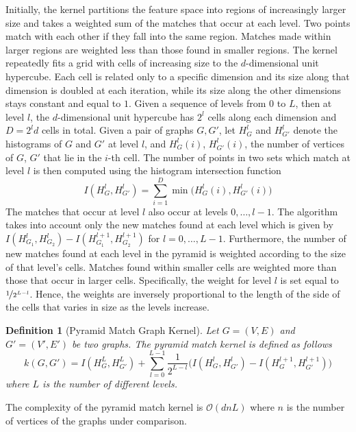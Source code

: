 \documentclass[twoside,11pt]{article}
\newtheorem{definition}{Definition}
\begin{document}
Initially, the kernel partitions the feature space into regions of increasingly larger size and takes a weighted sum of the matches that occur at each level.
Two points match with each other if they fall into the same region.
Matches made within larger regions are weighted less than those found in smaller regions.
The kernel repeatedly fits a grid with cells of increasing size to the $d$-dimensional unit hypercube.
Each cell is related only to a specific dimension and its size along that dimension is doubled at each iteration, while its size along the other dimensions stays constant and equal to $1$.
Given a sequence of levels from $0$ to $L$, then at level $l$, the $d$-dimensional unit hypercube has $2^l$ cells along each dimension and $D = 2^{l}d$ cells in total.
Given a pair of graphs $G,G'$, let $H_G^l$ and $H_{G'}^l$ denote the histograms of $G$ and $G'$ at level $l$, and $H_G^l(i)$, $H_{G'}^l(i)$, the number of vertices of $G$, $G'$ that lie in the $i$-th cell.
The number of points in two sets which match at level $l$ is then computed using the histogram intersection function
\begin{equation}
  I(H_G^l,H_{G'}^l) = \sum_{i=1}^D \min\big(H_G^l(i),H_{G'}^l(i)\big)
\end{equation}
The matches that occur at level $l$ also occur at levels $0, \ldots, l-1$.
The algorithm takes into account only the new matches found at each level which is given by $I(H_{G_1}^l,H_{G_2}^l) - I(H_{G_1}^{l+1},H_{G_2}^{l+1})$ for $l=0,\ldots,L-1$.
Furthermore, the number of new matches found at each level in the pyramid is weighted according to the size of that level's cells.
Matches found within smaller cells are weighted more than those that occur in larger cells.
Specifically, the weight for level $l$ is set equal to $\nicefrac{1}{2^{L-l}}$.
Hence, the weights are inversely proportional to the length of the side of the cells that varies in size as the levels increase.

\begin{definition}[Pyramid Match Graph Kernel]
  Let $G=(V,E)$ and $G'=(V',E')$ be two graphs.
	The pyramid match kernel is defined as follows
	\begin{equation}
	  k(G,G') = I(H_G^L,H_{G'}^L) + \sum_{l=0}^{L-1} \frac{1}{2^{L-l}}\big(I(H_G^l,H_{G'}^l) - I(H_G^{l+1},H_{G'}^{l+1})\big)
	\end{equation}
	where $L$ is the number of different levels.
\end{definition}
The complexity of the pyramid match kernel is $\mathcal{O}(dnL)$ where $n$ is the number of vertices of the graphs under comparison.
\end{document}
